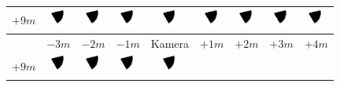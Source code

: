 \begin{tabular}{|c|c|c|c|c|c|c|c|c|}
	\hline 
	$+9m$ &
	\includegraphics[width=0.5cm]{img_Bereich/V2_img_res_Winkel_Y_-3000_9000.png}&
	\includegraphics[width=0.5cm]{img_Bereich/V2_img_res_Winkel_Y_-2000_9000.png}&
	\includegraphics[width=0.5cm]{img_Bereich/V2_img_res_Winkel_Y_-1000_9000.png}&
	\includegraphics[width=0.5cm]{img_Bereich/V2_img_res_Winkel_Y_0_9000.png}&
	\includegraphics[width=0.5cm]{img_Bereich/V2_img_res_Winkel_Y_1000_9000.png}&
	\includegraphics[width=0.5cm]{img_Bereich/V2_img_res_Winkel_Y_2000_9000.png}&
	\includegraphics[width=0.5cm]{img_Bereich/V2_img_res_Winkel_Y_3000_9000.png}&
	\includegraphics[width=0.5cm]{img_Bereich/V2_img_res_Winkel_Y_4000_9000.png}\\ 
	\hline 
	& $-3m$ & $-2m$ & $-1m$ &Kamera& $+1m$ & $+2m$ & $+3m$ & $+4m$ \\ 
	\hline
	\hline 
	$+9m$ &
	\includegraphics[width=0.5cm]{img_Bereich/V2_vid_res_Winkel_Y_-3000_9000.png}&
	\includegraphics[width=0.5cm]{img_Bereich/V2_vid_res_Winkel_Y_-2000_9000.png}&
	\includegraphics[width=0.5cm]{img_Bereich/V2_vid_res_Winkel_Y_-1000_9000.png}&
	\includegraphics[width=0.5cm]{img_Bereich/V2_vid_res_Winkel_Y_0_9000.png}&

\end{tabular}
